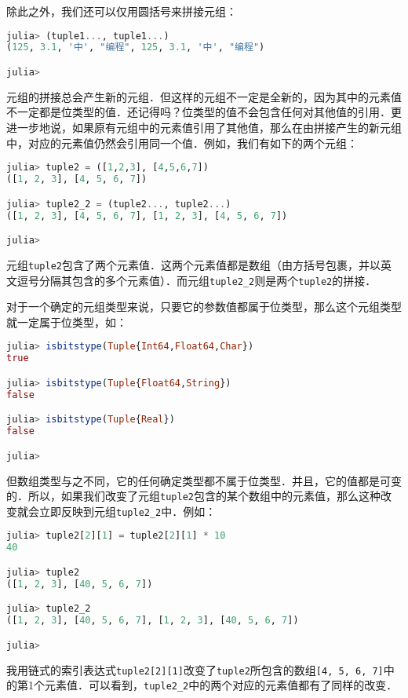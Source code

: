 除此之外，我们还可以仅用圆括号来拼接元组：
\begin{lstlisting}[language=julia]
julia> (tuple1..., tuple1...)
(125, 3.1, '中', "编程", 125, 3.1, '中', "编程")

julia> 
\end{lstlisting}

元组的拼接总会产生新的元组．但这样的元组不一定是全新的，因为其中的元素值不一定都是位类型的值．还记得吗？位类型的值不会包含任何对其他值的引用．更进一步地说，如果原有元组中的元素值引用了其他值，那么在由拼接产生的新元组中，对应的元素值仍然会引用同一个值．例如，我们有如下的两个元组：
\begin{lstlisting}[language=julia]
julia> tuple2 = ([1,2,3], [4,5,6,7])
([1, 2, 3], [4, 5, 6, 7])

julia> tuple2_2 = (tuple2..., tuple2...)
([1, 2, 3], [4, 5, 6, 7], [1, 2, 3], [4, 5, 6, 7])

julia> 
\end{lstlisting}

元组\verb|tuple2|包含了两个元素值．这两个元素值都是数组（由方括号包裹，并以英文逗号分隔其包含的多个元素值）．而元组\verb|tuple2_2|则是两个\verb|tuple2|的拼接．

对于一个确定的元组类型来说，只要它的参数值都属于位类型，那么这个元组类型就一定属于位类型，如：
\begin{lstlisting}[language=julia]
julia> isbitstype(Tuple{Int64,Float64,Char})
true

julia> isbitstype(Tuple{Float64,String})
false

julia> isbitstype(Tuple{Real})
false

julia> 
\end{lstlisting}

但数组类型与之不同，它的任何确定类型都不属于位类型．并且，它的值都是可变的．所以，如果我们改变了元组\verb|tuple2|包含的某个数组中的元素值，那么这种改变就会立即反映到元组\verb|tuple2_2|中．例如：
\begin{lstlisting}[language=julia]
julia> tuple2[2][1] = tuple2[2][1] * 10
40

julia> tuple2
([1, 2, 3], [40, 5, 6, 7])

julia> tuple2_2
([1, 2, 3], [40, 5, 6, 7], [1, 2, 3], [40, 5, 6, 7])

julia> 
\end{lstlisting}

我用链式的索引表达式\verb|tuple2[2][1]|改变了\verb|tuple2|所包含的数组\verb|[4, 5, 6, 7]|中的第1个元素值．可以看到，\verb|tuple2_2|中的两个对应的元素值都有了同样的改变．

